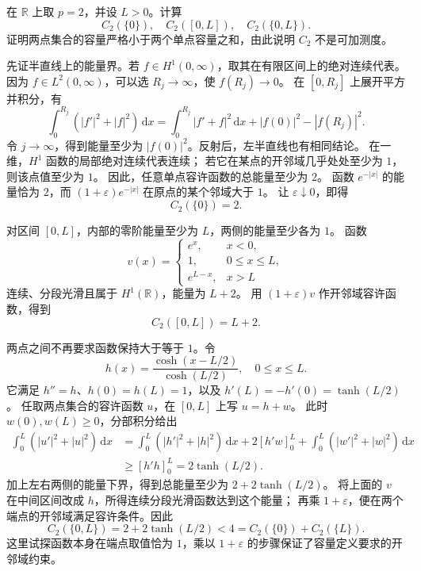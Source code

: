 \begin{optionalexercise}\label{b1:ex:26-one-dimensional-exact-capacity}
在 \(\mathbb R\) 上取 \(p=2\)，并设 \(L>0\)。计算
\[
 C_2(\{0\}),\quad C_2([0,L]),\quad C_2(\{0,L\}).
\]
证明两点集合的容量严格小于两个单点容量之和，由此说明 \(C_2\) 不是可加测度。
\end{optionalexercise}
\begin{solution}
先证半直线上的能量界。若 \(f\in H^1(0,\infty)\)，取其在有限区间上的绝对连续代表。
因为 \(f\in L^2(0,\infty)\)，可以选 \(R_j\to\infty\)，使 \(f(R_j)\to0\)。
在 \([0,R_j]\) 上展开平方并积分，有
\[
 \int_0^{R_j}(|f'|^2+|f|^2)\,\mathrm dx
 =\int_0^{R_j}|f'+f|^2\,\mathrm dx+|f(0)|^2-|f(R_j)|^2.
\]
令 \(j\to\infty\)，得到能量至少为 \(|f(0)|^2\)。反射后，左半直线也有相同结论。
在一维，\(H^1\) 函数的局部绝对连续代表连续；
若它在某点的开邻域几乎处处至少为 \(1\)，则该点值至少为 \(1\)。
因此，任意单点容许函数的总能量至少为 \(2\)。
函数 \(e^{-|x|}\) 的能量恰为 \(2\)，而
\((1+\varepsilon)e^{-|x|}\) 在原点的某个邻域大于 \(1\)。
让 \(\varepsilon\downarrow0\)，即得
\[
 C_2(\{0\})=2.
\]

对区间 \([0,L]\)，内部的零阶能量至少为 \(L\)，两侧的能量至少各为 \(1\)。
函数
\[
 v(x)=
 \begin{cases}
 e^x,&x<0,\\
 1,&0\le x\le L,\\
 e^{L-x},&x>L
 \end{cases}
\]
连续、分段光滑且属于 \(H^1(\mathbb R)\)，能量为 \(L+2\)。
用 \((1+\varepsilon)v\) 作开邻域容许函数，得到
\[
 C_2([0,L])=L+2.
\]

两点之间不再要求函数保持大于等于 \(1\)。令
\[
 h(x)=\frac{\cosh(x-L/2)}{\cosh(L/2)},\quad 0\le x\le L.
\]
它满足 \(h''=h\)、\(h(0)=h(L)=1\)，以及
\(h'(L)=-h'(0)=\tanh(L/2)\)。
任取两点集合的容许函数 \(u\)，在 \([0,L]\) 上写 \(u=h+w\)。
此时 \(w(0),w(L)\ge0\)，分部积分给出
\[
 \begin{aligned}
 \int_0^L(|u'|^2+|u|^2)\,\mathrm dx
 &=\int_0^L(|h'|^2+|h|^2)\,\mathrm dx
       +2[h'w]_0^L+\int_0^L(|w'|^2+|w|^2)\,\mathrm dx\\
 &\ge[h'h]_0^L=2\tanh(L/2).
 \end{aligned}
\]
加上左右两侧的能量下界，得到总能量至少为 \(2+2\tanh(L/2)\)。
将上面的 \(v\) 在中间区间改成 \(h\)，所得连续分段光滑函数达到这个能量；
再乘 \(1+\varepsilon\)，便在两个端点的开邻域满足容许条件。因此
\[
 C_2(\{0,L\})=2+2\tanh(L/2)<4=C_2(\{0\})+C_2(\{L\}).
\]
这里试探函数本身在端点取值恰为 \(1\)，乘以 \(1+\varepsilon\) 的步骤保证了容量定义要求的开邻域约束。
\end{solution}

